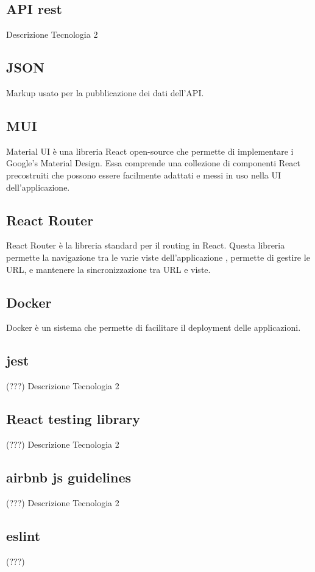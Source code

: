 \subsection*{API rest}
Descrizione Tecnologia 2

\subsection*{JSON}
Markup usato per la pubblicazione dei dati dell’API.

\subsection*{MUI}
Material UI è una libreria React open-source che permette di implementare i Google's Material Design. Essa comprende una collezione di componenti React precostruiti che possono essere facilmente adattati e messi in uso nella UI dell'applicazione.

\subsection*{React Router}
React Router è la libreria standard per il routing in React. Questa libreria permette la navigazione tra le varie viste dell'applicazione , permette di gestire le URL, e mantenere la sincronizzazione tra URL e viste.

\subsection*{Docker}
Docker è un sistema che permette di facilitare il deployment delle applicazioni.

\subsection*{jest} (???)
Descrizione Tecnologia 2

\subsection*{React testing library} (???)
Descrizione Tecnologia 2

\subsection*{airbnb js guidelines} (???)
Descrizione Tecnologia 2

\subsection*{eslint} (???)

